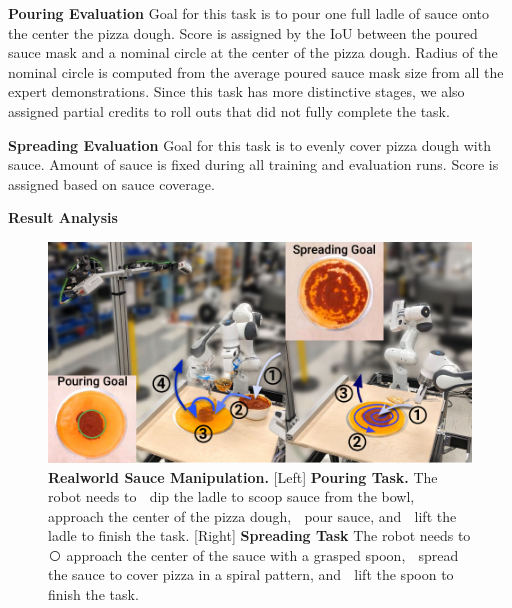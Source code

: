 \textbf{Pouring Evaluation}
Goal for this task is to pour one full ladle of sauce onto the center the pizza dough. Score is assigned by the IoU between the poured sauce mask and a nominal circle at the center of the pizza dough. Radius of the nominal circle is computed from the average poured sauce mask size from all the expert demonstrations. Since this task has more distinctive stages, we also assigned partial credits to roll outs that did not fully complete the task.

\textbf{Spreading Evaluation}
Goal for this task is to evenly cover pizza dough with sauce. Amount of sauce is fixed during all training and evaluation runs. Score is assigned based on sauce coverage.


\textbf{Result Analysis}




\begin{figure}[t]
\centering
\includegraphics[width=\linewidth]{figure/real_sauce_setup.pdf}

\vspace{2mm}

\caption{\textbf{Realworld Sauce Manipulation. }
[Left] \textbf{Pouring Task.} The robot needs to \textcircled{} dip the ladle to scoop sauce from the bowl, \textcircled{} approach the center of the pizza dough, \textcircled{} pour sauce, and \textcircled{} lift the ladle to finish the task.
[Right] \textbf{Spreading Task} The robot needs to \textcircled{} approach the center of the sauce with a grasped spoon, \textcircled{} spread the sauce to cover pizza in a spiral pattern, and \textcircled{} lift the spoon to finish the task.
}
\end{figure}







